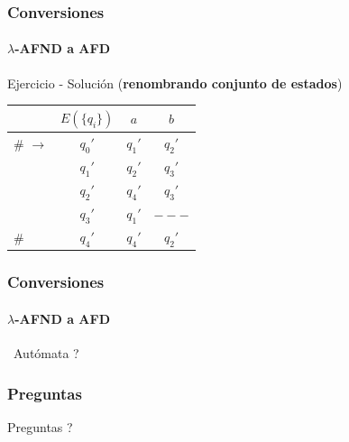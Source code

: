 \documentclass{beamer}
\begin{document}
        \begin{frame}
			\frametitle{Conversiones}
			\framesubtitle{$\lambda$-AFND a AFD}

            \begin{exampleblock}{Ejercicio - Soluci\'on (\textbf{renombrando conjunto de estados})}
               \begin{table}
                   \begin{center}
                       \begin{tabular}{lc|c|c} 
                           & $E(\{q_{i}\})$ & $a$ & $b$ \\ \hline
                            \# $\rightarrow$ & $q_{0}'$ & $q_{1}'$ & $q_{2}'$ \\
                           & $q_{1}'$ & $q_{2}'$ & $q_{3}'$ \\
                           & $q_{2}'$ & $q_{4}'$ & $q_{3}'$ \\
                           & $q_{3}'$ & $q_{1}'$ & $---$ \\
                           \# & $q_{4}'$ & $q_{4}'$ & $q_{2}'$ \\
                       \end{tabular}
                   \end{center}
               \end{table}
            \end{exampleblock}
		\end{frame}		

        \begin{frame}
			\frametitle{Conversiones}
			\framesubtitle{$\lambda$-AFND a AFD}
           
               \hspace{4cm}\huge{\textquestiondown~Aut\'omata ?}
		\end{frame}	

		\begin{frame}
			\frametitle{Preguntas}

			\hspace{4cm}\huge{Preguntas ?}
		
		\end{frame}
	
\end{document}
